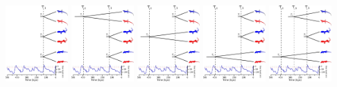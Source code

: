 \begin{frame}[t]
    \begin{minipage}[t][0.35\textheight][c]{1.1\linewidth}
        \begin{adjustwidth}{-2.3em}{}
        \includegraphics[height=2.9cm]{../images/dmc-cartoon-no-islands-shared.pdf}
        \hspace{0.2mm}
        \includegraphics[height=2.9cm]{../images/dmc-cartoon-no-islands-2-1.pdf}
        \hspace{0.2mm}
        \includegraphics[height=2.9cm]{../images/dmc-cartoon-no-islands-2-2.pdf}
        \hspace{0.2mm}
        \includegraphics[height=2.9cm]{../images/dmc-cartoon-no-islands-2-3.pdf}
        \hspace{0.2mm}
        \includegraphics[height=2.9cm]{../images/dmc-cartoon-no-islands-general.pdf}
        \end{adjustwidth}
    \end{minipage}


\end{frame}
